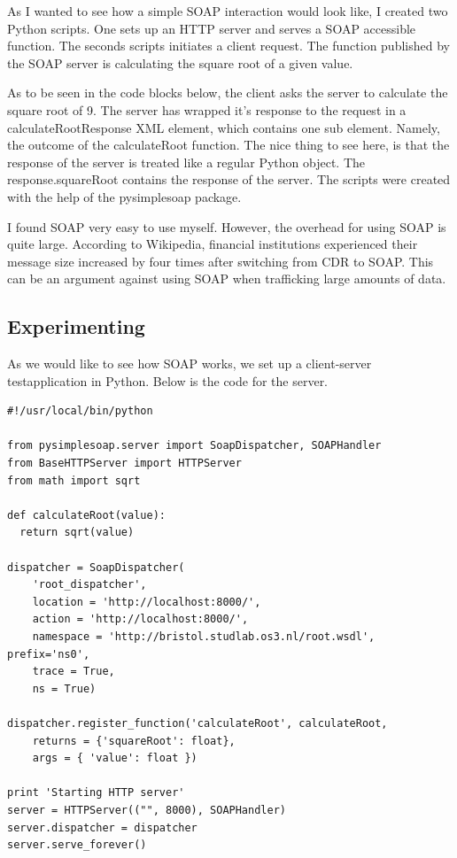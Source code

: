 As I wanted to see how a simple SOAP interaction would look like, I created two Python scripts. One sets up an HTTP server and serves a SOAP accessible function. The seconds scripts initiates a client request. The function published by the SOAP server is calculating the square root of a given value.

As to be seen in the code blocks below, the client asks the server to calculate the square root of 9. The server has wrapped it's response to the request in a calculateRootResponse XML element, which contains one sub element. Namely, the outcome of the calculateRoot function. The nice thing to see here, is that the response of the server is treated like a regular Python object. The response.squareRoot contains the response of the server. The scripts were created with the help of the pysimplesoap package.

I found SOAP very easy to use myself. However, the overhead for using SOAP is quite large. According to Wikipedia, financial institutions experienced their message size increased by four times after switching from CDR to SOAP. This can be an argument against using SOAP when trafficking large amounts of data.

\subsection{Experimenting}
As we would like to see how SOAP works, we set up a client-server testapplication in Python. Below is the code for the server.

\begin{verbatim}
#!/usr/local/bin/python
 
from pysimplesoap.server import SoapDispatcher, SOAPHandler
from BaseHTTPServer import HTTPServer
from math import sqrt
 
def calculateRoot(value):
  return sqrt(value)
 
dispatcher = SoapDispatcher(
    'root_dispatcher',
    location = 'http://localhost:8000/',
    action = 'http://localhost:8000/',
    namespace = 'http://bristol.studlab.os3.nl/root.wsdl', prefix='ns0',
    trace = True,
    ns = True)
 
dispatcher.register_function('calculateRoot', calculateRoot,
    returns = {'squareRoot': float},
    args = { 'value': float })
 
print 'Starting HTTP server'
server = HTTPServer(("", 8000), SOAPHandler)
server.dispatcher = dispatcher
server.serve_forever()
\end{verbatim}

